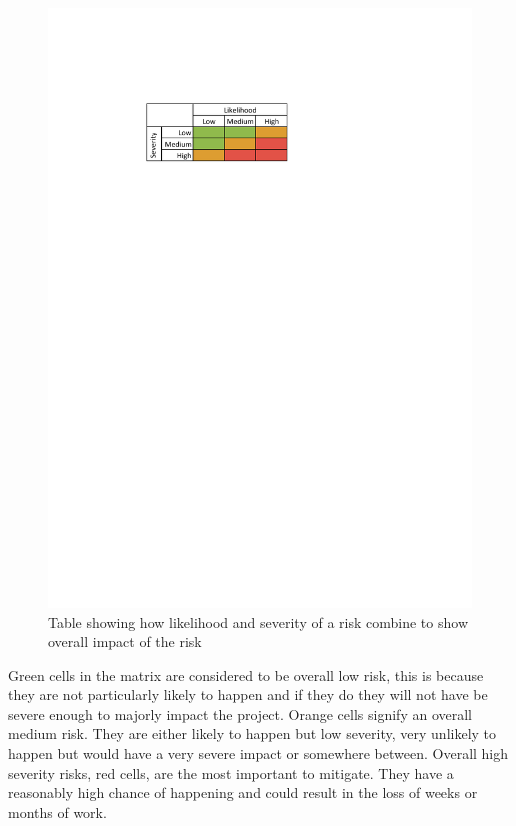 \begin{figure}[h]
	\begin{centering}
		\includegraphics{risktable.pdf}
		\caption{Table showing how likelihood and severity of a risk combine to show overall impact of the risk}
		\label{fig:risktable}
	\end{centering}
\end{figure}

Green cells in the matrix are considered to be overall low risk, this is because they are not particularly likely to happen and if they do they will not have be severe enough to majorly impact the project.
Orange cells signify an overall medium risk.
They are either likely to happen but low severity, very unlikely to happen but would have a very severe impact or somewhere between.
Overall high severity risks, red cells, are the most important to mitigate.
They have a reasonably high chance of happening and could result in the loss of weeks or months of work.

